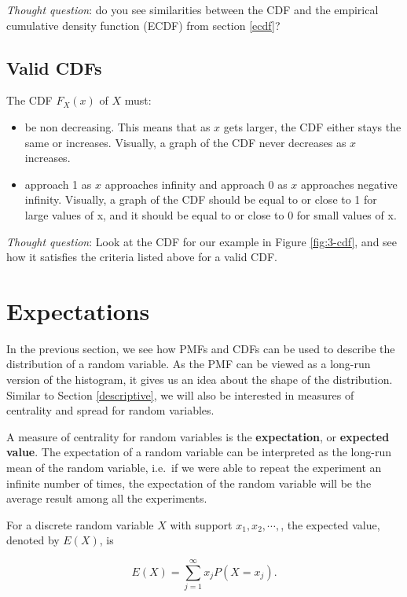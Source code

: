 \documentclass[
]{book}
\providecommand{\tightlist}{%
  \setlength{\itemsep}{0pt}\setlength{\parskip}{0pt}}
\begin{document}
\emph{Thought question}: do you see similarities between the CDF and the empirical cumulative density function (ECDF) from section \ref{ecdf}?

\subsection{Valid CDFs}\label{valid-cdfs}

The CDF \(F_X(x)\) of \(X\) must:

\begin{itemize}
\tightlist
\item
  be non decreasing. This means that as \(x\) gets larger, the CDF either stays the same or increases. Visually, a graph of the CDF never decreases as \(x\) increases.
\item
  approach 1 as \(x\) approaches infinity and approach 0 as \(x\) approaches negative infinity. Visually, a graph of the CDF should be equal to or close to 1 for large values of x, and it should be equal to or close to 0 for small values of x.
\end{itemize}

\emph{Thought question}: Look at the CDF for our example in Figure \ref{fig:3-cdf}, and see how it satisfies the criteria listed above for a valid CDF.

\section{Expectations}\label{expectations}

In the previous section, we see how PMFs and CDFs can be used to describe the distribution of a random variable. As the PMF can be viewed as a long-run version of the histogram, it gives us an idea about the shape of the distribution. Similar to Section \ref{descriptive}, we will also be interested in measures of centrality and spread for random variables.

A measure of centrality for random variables is the \textbf{expectation}, or \textbf{expected value}. The expectation of a random variable can be interpreted as the long-run mean of the random variable, i.e.~if we were able to repeat the experiment an infinite number of times, the expectation of the random variable will be the average result among all the experiments.

For a discrete random variable \(X\) with support \(x_1, x_2, \cdots,\), the expected value, denoted by \(E(X)\), is

\begin{equation} 
E(X) = \sum_{j=1}^{\infty} x_j P(X=x_j).
\label{eq:3-EX}
\end{equation}
\end{document}

